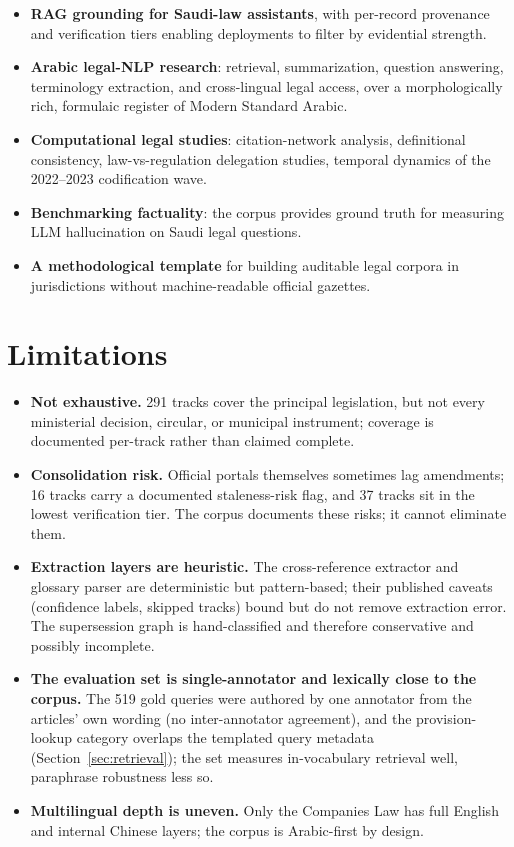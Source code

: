 \documentclass[11pt]{article}
\begin{document}
\begin{itemize}
  \item \textbf{RAG grounding for Saudi-law assistants}, with per-record
    provenance and verification tiers enabling deployments to filter by
    evidential strength.
  \item \textbf{Arabic legal-NLP research}: retrieval, summarization,
    question answering, terminology extraction, and cross-lingual legal
    access, over a morphologically rich, formulaic register of Modern
    Standard Arabic.
  \item \textbf{Computational legal studies}: citation-network analysis,
    definitional consistency, law-vs-regulation delegation studies,
    temporal dynamics of the 2022--2023 codification wave.
  \item \textbf{Benchmarking factuality}: the corpus provides ground truth
    for measuring LLM hallucination on Saudi legal questions.
  \item \textbf{A methodological template} for building auditable legal
    corpora in jurisdictions without machine-readable official gazettes.
\end{itemize}

\section{Limitations}
\label{sec:limitations}

\begin{itemize}
  \item \textbf{Not exhaustive.} 291 tracks cover the principal
    legislation, but not every ministerial decision, circular, or municipal
    instrument; coverage is documented per-track rather than claimed
    complete.
  \item \textbf{Consolidation risk.} Official portals themselves sometimes
    lag amendments; 16 tracks carry a documented staleness-risk flag, and
    37 tracks sit in the lowest verification tier. The corpus documents
    these risks; it cannot eliminate them.
  \item \textbf{Extraction layers are heuristic.} The cross-reference
    extractor and glossary parser are deterministic but pattern-based;
    their published caveats (confidence labels, skipped tracks) bound but
    do not remove extraction error. The supersession graph is
    hand-classified and therefore conservative and possibly incomplete.
  \item \textbf{The evaluation set is single-annotator and lexically close
    to the corpus.} The 519 gold queries were authored by one annotator
    from the articles' own wording (no inter-annotator agreement), and the
    provision-lookup category overlaps the templated query metadata
    (Section~\ref{sec:retrieval}); the set measures in-vocabulary retrieval
    well, paraphrase robustness less so.
  \item \textbf{Multilingual depth is uneven.} Only the Companies Law has
    full English and internal Chinese layers; the corpus is Arabic-first by
    design.
\end{itemize}
\end{document}
